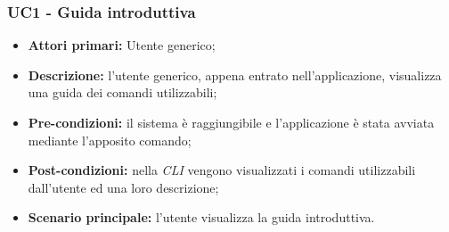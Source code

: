 \subsubsection{UC1 - Guida introduttiva}
\begin{itemize}
	\item \textbf{Attori primari:} Utente generico;
	\item \textbf{Descrizione:} l'utente generico, appena entrato nell'applicazione, visualizza una guida dei comandi utilizzabili; 
	\item \textbf{Pre-condizioni:} il sistema è raggiungibile e l'applicazione è stata avviata mediante l'apposito comando;
	\item \textbf{Post-condizioni:} nella \textit{CLI\glo} vengono visualizzati i comandi utilizzabili dall'utente ed una loro descrizione;
	\item \textbf{Scenario principale:} l'utente visualizza la guida introduttiva.
\end{itemize}